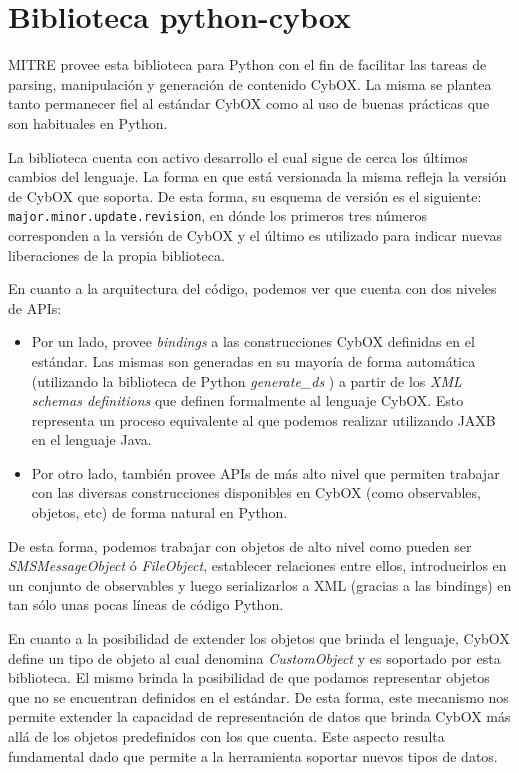 \section{Biblioteca python-cybox}
\label{bibliotecaPythonCybOX}
MITRE provee esta biblioteca \cite{python-cybox-github} para Python con el fin de facilitar las tareas de parsing, manipulación y generación de contenido CybOX. La misma se plantea tanto permanecer fiel al estándar CybOX como al uso de buenas prácticas que son habituales en Python.

La biblioteca cuenta con activo desarrollo el cual sigue de cerca los últimos cambios del lenguaje. La forma en que está versionada la misma refleja la versión de CybOX que soporta. De esta forma, su esquema de versión es el siguiente: \texttt{major.minor.update.revision}, en dónde los primeros tres números corresponden a la versión de CybOX y el último es utilizado para indicar nuevas liberaciones de la propia biblioteca.

En cuanto a la arquitectura del código, podemos ver que cuenta con dos niveles de APIs:

\begin{itemize}
\item Por un lado, provee \emph{bindings} a las construcciones CybOX definidas en el estándar. Las mismas son generadas en su mayoría de forma automática (utilizando la biblioteca de Python \emph{generate\_ds} \cite{generateDS}) a partir de los \emph{XML schemas definitions} que definen formalmente al lenguaje CybOX. Esto representa un proceso equivalente al que podemos realizar utilizando JAXB \cite{JAXB} en el lenguaje Java.
\item Por otro lado, también provee APIs de más alto nivel que permiten trabajar con las diversas construcciones disponibles en CybOX (como observables, objetos, etc) de forma natural en Python.
\end{itemize}

De esta forma, podemos trabajar con objetos de alto nivel como pueden ser \emph{SMSMessageObject} ó \emph{FileObject}, establecer relaciones entre ellos, introducirlos en un conjunto de observables y luego serializarlos a XML (gracias a las bindings) en tan sólo unas pocas líneas de código Python.

En cuanto a la posibilidad de extender los objetos que brinda el lenguaje, CybOX define un tipo de objeto al cual denomina \emph{CustomObject} y es soportado por esta biblioteca. El mismo brinda la posibilidad de que podamos representar objetos que no se encuentran definidos en el estándar. De esta forma, este mecanismo nos permite extender la capacidad de representación de datos que brinda CybOX más allá de los objetos predefinidos con los que cuenta. Este aspecto resulta fundamental dado que permite a la herramienta soportar nuevos tipos de datos.

